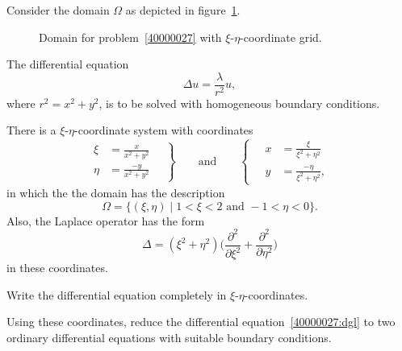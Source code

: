 Consider the domain $\Omega$ as depicted in figure~\ref{40000027:domain}.
\begin{figure}[ht]
\centering
{}
\caption{Domain for problem~\ref{40000027} with $\xi$-$\eta$-coordinate
grid.
\label{40000027:domain}}
\end{figure}
The differential equation
\begin{equation}
\Delta u = \frac{\lambda}{r^2} u,
\label{40000027:dgl}
\end{equation}
where $r^2= x^2 +y^2$, is to be solved with homogeneous boundary
conditions.

There is a $\xi$-$\eta$-coordinate system with coordinates
\[
\left.
\begin{aligned}
\xi  &= \frac{ x}{x^2+y^2}\\
\eta &= \frac{-y}{x^2+y^2}
\end{aligned}
\quad\right\}
\qquad\text{and}\qquad
\left\{\quad
\begin{aligned}
x &= \frac{\xi}{\xi^2+\eta^2}\\
y &= \frac{-\eta}{\xi^2+\eta^2},
\end{aligned}
\right.
\]
in which the the domain has the description
\begin{equation}
\Omega
=
\{ (\xi,\eta)\mid 1<\xi<2\text{ and } -1< \eta< 0\}.
\label{40000027:domainxieta}
\end{equation}
Also, the Laplace operator has the form
\[
\Delta
=
(\xi^2+\eta^2)
\biggl(\frac{\partial^2}{\partial \xi^2}
+
\frac{\partial^2}{\partial \eta^2}\biggr)
\]
in these coordinates.
\begin{teilaufgaben}
\item
Write the differential equation completely in $\xi$-$\eta$-coordinates.
\item
Using these coordinates, reduce the differential equation~\eqref{40000027:dgl}
to two ordinary differential equations with suitable boundary conditions.
\end{teilaufgaben}

